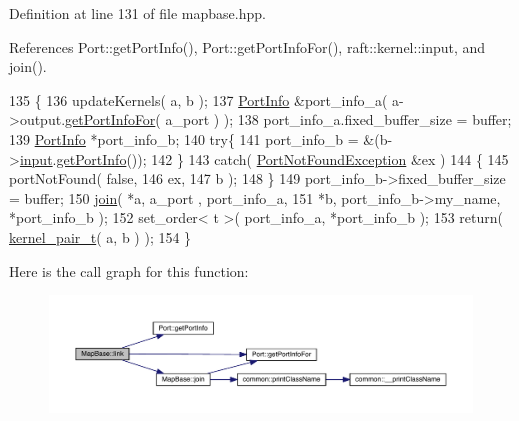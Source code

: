 Definition at line 131 of file mapbase.\+hpp.



References Port\+::get\+Port\+Info(), Port\+::get\+Port\+Info\+For(), raft\+::kernel\+::input, and join().


\begin{DoxyCode}
135    \{
136       updateKernels( a, b );
137       \hyperlink{struct_port_info}{PortInfo} &port\_info\_a( a->output.\hyperlink{class_port_afb426a015195fa9b4b5b1d1200daf8ed}{getPortInfoFor}( a\_port ) );
138       port\_info\_a.fixed\_buffer\_size = buffer;
139       \hyperlink{struct_port_info}{PortInfo} *port\_info\_b;
140       \textcolor{keywordflow}{try}\{
141          port\_info\_b = &(b->\hyperlink{classraft_1_1kernel_a6edbe35a56409d402e719b3ac36d6554}{input}.\hyperlink{class_port_a4af1cb062940ca3b83c569f024b9a8d1}{getPortInfo}());
142       \}
143       \textcolor{keywordflow}{catch}( \hyperlink{class_port_not_found_exception}{PortNotFoundException} &ex ) 
144       \{
145             portNotFound( \textcolor{keyword}{false},
146                           ex,
147                           b );
148       \}
149       port\_info\_b->fixed\_buffer\_size = buffer;
150       \hyperlink{class_map_base_a2624d7b81f0078dcc78e524045403e28}{join}( *a, a\_port , port\_info\_a, 
151             *b, port\_info\_b->my\_name, *port\_info\_b );
152       set\_order< t >( port\_info\_a, *port\_info\_b ); 
153       \textcolor{keywordflow}{return}( \hyperlink{classkernel__pair__t}{kernel\_pair\_t}( a, b ) );
154    \}
\end{DoxyCode}
Here is the call graph for this function\+:
\nopagebreak
\begin{figure}[H]
\begin{center}
\leavevmode
\includegraphics[width=350pt]{class_map_base_ad982ebf61439a069ed36dc5f756b732a_cgraph}
\end{center}
\end{figure}
\hypertarget{class_map_base_a19a0a2f6842a863327920776457c52bf}{}\label{class_map_base_a19a0a2f6842a863327920776457c52bf} 
